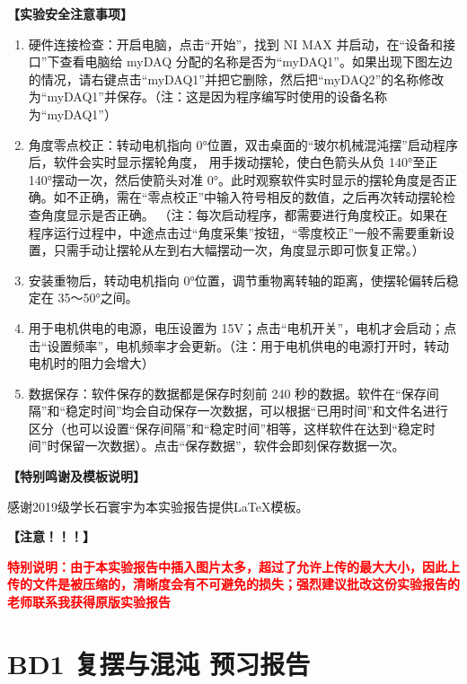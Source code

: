 \documentclass[dvipsnames, svgnames,a4paper,11pt]{article}
\begin{document}
	\textbf{【实验安全注意事项】}	
	\begin{enumerate}
		\item 硬件连接检查：开启电脑，点击“开始”，找到 NI MAX 并启动，在“设备和接口”下查看电脑给 myDAQ 分配的名称是否为“myDAQ1”。如果出现下图左边的情况，请右键点击“myDAQ1”并把它删除，然后把“myDAQ2”的名称修改为“myDAQ1”并保存。（注：这是因为程序编写时使用的设备名称为“myDAQ1”）
		\item 角度零点校正：转动电机指向 0°位置，双击桌面的“玻尔机械混沌摆”启动程序后，软件会实时显示摆轮角度， 用手拨动摆轮，使白色箭头从负 140°至正 140°摆动一次，然后使箭头对准 0°。此时观察软件实时显示的摆轮角度是否正确。如不正确，需在“零点校正”中输入符号相反的数值，之后再次转动摆轮检查角度显示是否正确。
		（注：每次启动程序，都需要进行角度校正。如果在程序运行过程中，中途点击过“角度采集”按钮，“零度校正”一般不需要重新设置，只需手动让摆轮从左到右大幅摆动一次，角度显示即可恢复正常。）
		\item 安装重物后，转动电机指向 0°位置，调节重物离转轴的距离，使摆轮偏转后稳定在 35～50°之间。
		\item 用于电机供电的电源，电压设置为 15V；点击“电机开关”，电机才会启动；点击“设置频率”，电机频率才会更新。（注：用于电机供电的电源打开时，转动电机时的阻力会增大）
		\item 数据保存：软件保存的数据都是保存时刻前 240 秒的数据。软件在“保存间隔”和“稳定时间”均会自动保存一次数据，可以根据“已用时间”和文件名进行区分（也可以设置“保存间隔”和“稳定时间”相等，这样软件在达到“稳定时间”时保留一次数据）。点击“保存数据”，软件会即刻保存数据一次。
				
	\end{enumerate}
	
	\textbf{【特别鸣谢及模板说明】}	
	
	感谢2019级学长石寰宇为本实验报告提供\LaTeX 模板。
	
	\textbf{【注意！！！】}	
	
	\textcolor{red}{\textbf{\Huge 特别说明：由于本实验报告中插入图片太多，超过了允许上传的最大大小，因此上传的文件是被压缩的，清晰度会有不可避免的损失；强烈建议批改这份实验报告的老师联系我获得原版实验报告}}
	
	
	
	
	
		
	
	\clearpage
	\tableofcontents
	\clearpage
	
	
	
	\setcounter{section}{0}
	\section{BD1 复摆与混沌 \quad\heiti 预习报告}
	
\end{document}
